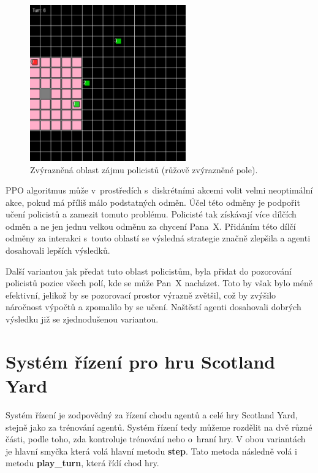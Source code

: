 \begin{figure}[H]
	\centering
	\includegraphics[width=0.6\textwidth]{obrazky-figures/interest_area}
      \caption{Zvýrazněná oblast zájmu policistů (růžově zvýrazněné pole).}
    \label{fig:game_11}
\end{figure}

PPO algoritmus může v~prostředích s~diskrétními akcemi volit velmi neoptimální akce, pokud má příliš málo podstatných odměn\cite{PPO_weakness}.
Účel této odměny je podpořit učení policistů a zamezit tomuto problému.
Policisté tak získávají více dílčích odměn a ne jen jednu velkou odměnu za chycení Pana~X\@.
Přidáním této dílčí odměny za interakci s~touto oblastí se výsledná strategie značně zlepšila a agenti dosahovali lepších výsledků.

Další variantou jak předat tuto oblast policistům, byla přidat do pozorování policistů pozice všech polí, kde se může Pan~X nacházet.
Toto by však bylo méně efektivní, jelikož by se pozorovací prostor výrazně zvětšil, což by zvýšilo náročnost výpočtů a zpomalilo by se učení.
Naštěstí agenti dosahovali dobrých výsledku již se zjednodušenou variantou.

\section{Systém řízení pro hru Scotland Yard}
\label{sec:system_rizeni}
Systém řízení je zodpovědný za řízení chodu agentů a celé hry Scotland Yard, stejně jako za trénování agentů.
Systém řízení tedy můžeme rozdělit na dvě různé části, podle toho, zda kontroluje trénování nebo o~hraní hry.
V obou variantách je hlavní smyčka která volá hlavní metodu \textbf{step}.
Tato metoda následně volá i metodu \textbf{play\_turn}, která řídí chod hry.

